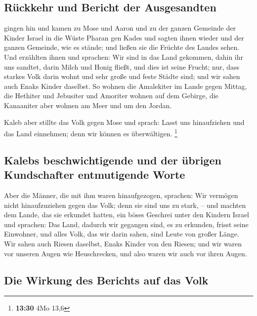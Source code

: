 \hypertarget{ruxfcckkehr-und-bericht-der-ausgesandten}{%
\subsection{Rückkehr und Bericht der
Ausgesandten}\label{ruxfcckkehr-und-bericht-der-ausgesandten}}

 gingen hin und kamen zu Mose und Aaron und zu der ganzen
Gemeinde der Kinder Israel in die Wüste Pharan gen Kades und sagten
ihnen wieder und der ganzen Gemeinde, wie es stände; und ließen sie die
Früchte des Landes sehen.  Und erzählten ihnen und
sprachen: Wir sind in das Land gekommen, dahin ihr uns sandtet, darin
Milch und Honig fließt, und dies ist seine Frucht;  nur,
dass starkes Volk darin wohnt und sehr große und feste Städte sind; und
wir sahen auch Enaks Kinder daselbst.  So wohnen die
Amalekiter im Lande gegen Mittag, die Hethiter und Jebusiter und
Amoriter wohnen auf dem Gebirge, die Kanaaniter aber wohnen am Meer und
um den Jordan.

 Kaleb aber stillte das Volk gegen Mose und sprach: Lasst
uns hinaufziehen und das Land einnehmen; denn wir können es
überwältigen. \footnote{\textbf{13:30} 4Mo 13,6}

\hypertarget{kalebs-beschwichtigende-und-der-uxfcbrigen-kundschafter-entmutigende-worte}{%
\subsection{Kalebs beschwichtigende und der übrigen Kundschafter
entmutigende
Worte}\label{kalebs-beschwichtigende-und-der-uxfcbrigen-kundschafter-entmutigende-worte}}

 Aber die Männer, die mit ihm waren hinaufgezogen,
sprachen: Wir vermögen nicht hinaufzuziehen gegen das Volk; denn sie
sind uns zu stark, --  und machten dem Lande, das sie
erkundet hatten, ein böses Geschrei unter den Kindern Israel und
sprachen: Das Land, dadurch wir gegangen sind, es zu erkunden, frisst
seine Einwohner, und alles Volk, das wir darin sahen, sind Leute von
großer Länge.  Wir sahen auch Riesen daselbst, Enaks
Kinder von den Riesen; und wir waren vor unseren Augen wie Heuschrecken,
und also waren wir auch vor ihren Augen.

\hypertarget{die-wirkung-des-berichts-auf-das-volk}{%
\subsection{Die Wirkung des Berichts auf das
Volk}\label{die-wirkung-des-berichts-auf-das-volk}}


